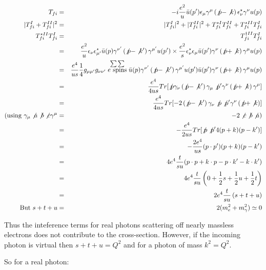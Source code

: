 \begin{eqnarray*}
  T_{fi} & = & -i\frac{e^2}{u}\bar{u}(p')\epsilon_{\mu}\gamma^{\mu}\left(\not{p} - \not{k}\right)\epsilon^{\star}_{\nu}\gamma^{\nu}u(p) \\
  |T_{fi}^{I} + T_{fi}^{II}|^2 & = & |T_{fi}^{I}|^2 + |T_{fi}^{II}|^2 + T_{fi}^{\star I}T_{fi}^{II} + T_{fi}^{\star II}T_{fi}^{I} \\
  T_{fi}^{\star II}T_{fi}^{I} & = & T_{fi}^{\dagger II}T_{fi}^{I} \\
  & = & \frac{e^2}{u}\epsilon_{\nu}\epsilon^{\star}_{\mu'}\bar{u}(p)\gamma^{\nu'}\left(\not{p} - \not{k}'\right)\gamma^{\mu'}u(p')\times\frac{e^2}{s}\epsilon^{\star}_{\nu}\epsilon_{\mu}\bar{u}(p')\gamma^{\nu}\left(\not{p} + \not{k}\right)\gamma^{\mu}u(p) \\
  & = & \frac{e^4}{us}\frac{1}{4}g_{\mu\mu'}g_{\nu\nu'}\stackrel{\sum\sum}{e \textrm{ spins}}\bar{u}(p)\gamma^{\nu'}\left(\not{p} - \not{k}'\right)\gamma^{\mu'}u(p')\bar{u}(p')\gamma^{\nu}\left(\not{p} + \not{k}\right)\gamma^{\mu}u(p) \\
  & = & \frac{e^4}{4us}Tr[\not{p}\gamma_{\nu}\left(\not{p} - \not{k}'\right)\gamma_{\mu}\not{p}'\gamma^{\nu}\left(\not{p} + \not{k}\right)\gamma^{\mu}] \\
  & = & \frac{e^4}{4us}Tr[-2\left(\not{p} - \not{k}'\right)\gamma_{\nu}\not{p}\not{p}'\gamma^{\nu}\left(\not{p} + \not{k}\right)] \\
  \textrm{(using } \gamma_{\mu}\not{a}\not{b}\not{c}\gamma^{\mu} & = & -2\not{c}\not{b}\not{a} \textrm{)} \\
  & = & -\frac{e^4}{2us}Tr[\not{p}\not{p'}4(p + k)(p - k')] \\
  & = & -\frac{2e^4}{us}(p\cdot p')(p + k)(p - k') \\
  & = & 4e^4\frac{t}{su}(p\cdot p + k\cdot p - p\cdot k' -k\cdot k') \\
  & = & 4e^4\frac{t}{su}\left(0 + \frac{1}{2}s + \frac{1}{2}u + \frac{1}{2}t \right) \\
  & = & 2e^4\frac{t}{su}\left(s + t + u\right) \\
  \textrm{But } s + t + u & = & 2(m_e^2 + m_{\gamma}^2) \simeq 0
\end{eqnarray*}

Thus the inteference terms for real photons scattering off nearly massless electrons does not contribute to the cross-section.  However, if the incoming photon is virtual then $s + t + u = Q^2$ and for a photon of mass $k^2 = Q^2$.

So for a real photon:

